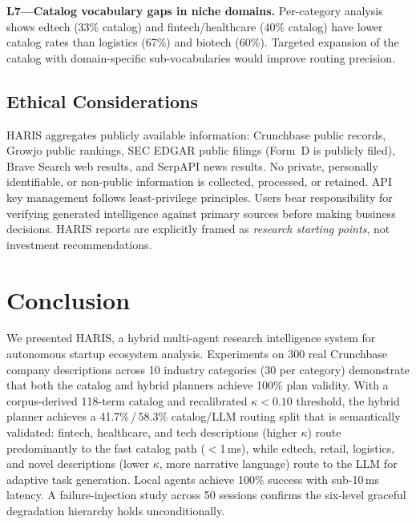 \documentclass[preprint,12pt]{elsarticle}
\begin{document}
\textbf{L7---Catalog vocabulary gaps in niche domains.} Per-category analysis
shows edtech (33\% catalog) and fintech/healthcare (40\% catalog) have lower
catalog rates than logistics (67\%) and biotech (60\%). Targeted expansion of the
catalog with domain-specific sub-vocabularies would improve routing precision.

\subsection{Ethical Considerations}

HARIS aggregates publicly available information: Crunchbase public records, Growjo
public rankings, SEC EDGAR public filings (Form~D is publicly filed), Brave
Search web results, and SerpAPI news results. No private, personally identifiable,
or non-public information is collected, processed, or retained. API key management
follows least-privilege principles. Users bear responsibility for verifying
generated intelligence against primary sources before making business decisions.
HARIS reports are explicitly framed as \emph{research starting points}, not
investment recommendations.

\section{Conclusion}
\label{sec:conclusion}

We presented HARIS, a hybrid multi-agent research intelligence system for
autonomous startup ecosystem analysis. Experiments on 300 real Crunchbase company
descriptions across 10 industry categories (30 per category) demonstrate that
both the catalog and hybrid planners achieve 100\% plan validity. With a corpus-derived 118-term
catalog and recalibrated $\kappa < 0.10$ threshold, the hybrid planner achieves a
41.7\%\,/\,58.3\% catalog/LLM routing split that is semantically
validated: fintech, healthcare, and tech descriptions (higher $\kappa$)
route predominantly to the fast catalog path ($<$1\,ms), while edtech,
retail, logistics, and novel descriptions (lower $\kappa$, more narrative
language) route to the LLM for adaptive task generation. Local agents achieve 100\% success with sub-10\,ms latency. A
failure-injection study across 50 sessions confirms the six-level graceful
degradation hierarchy holds unconditionally.
\end{document}
